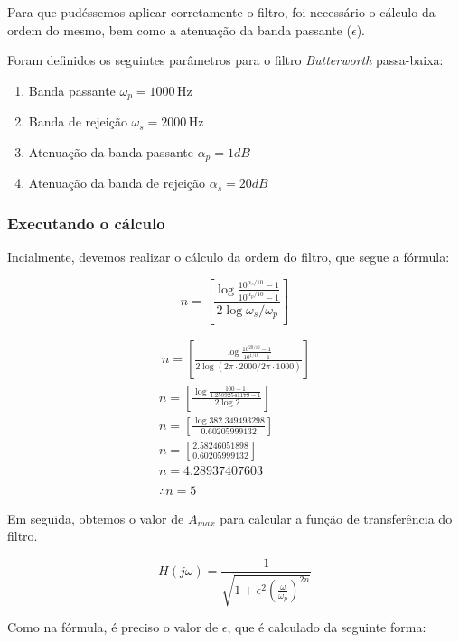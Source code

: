 Para que pudéssemos aplicar corretamente o filtro, foi necessário o cálculo da ordem do mesmo, bem como a atenuação da banda passante ($\epsilon$).

Foram definidos os seguintes parâmetros para o filtro \textit{Butterworth} passa-baixa:

\begin{enumerate}
    \item Banda passante $\omega_p=1000 \, \text{Hz}$
    \item Banda de rejeição $\omega_s = 2000\, \text{Hz}$
    \item Atenuação da banda passante $\alpha_p = 1dB$
    \item Atenuação da banda de rejeição $\alpha_s = 20dB$
\end{enumerate}


\subsubsection*{Executando o cálculo}
Incialmente, devemos realizar o cálculo da ordem do filtro, que segue a fórmula:

$$
    n = \left[ \frac{\log{\frac{10^{\alpha_s/10}- 1}{10^{\alpha_p/10}-1}}}{2\log{\omega_s/\omega_p}} \right]
$$

\begin{align} \
    n = \left[ \frac{\log{\frac{10^{20/10}- 1}{10^{1/10}-1}}}{2\log{(2\pi \cdot2000/2\pi\cdot 1000)}} \right] \\
    n = \left[ \frac{\log{\frac{100- 1}{1.25892541179-1}}}{2\log{2}} \right]                                  \\
    n = \left[ \frac{\log{382.349493298}}{0.60205999132} \right]                                              \\
    n = \left[ \frac{2.58246051898}{0.60205999132} \right]                                                    \\
    n = 4.28937407603                                                                                         \\
    \\
    \therefore n = 5
\end{align}


Em seguida, obtemos o valor de $A_{max}$ para calcular a função de transferência do filtro.

$$
    H(j\omega) = \frac{1}{\sqrt{1+\epsilon^2 \left( \frac{\omega}{\omega_p} \right)^{2n}}}
$$

Como na fórmula, é preciso o valor de $\epsilon$, que é calculado da seguinte forma:

